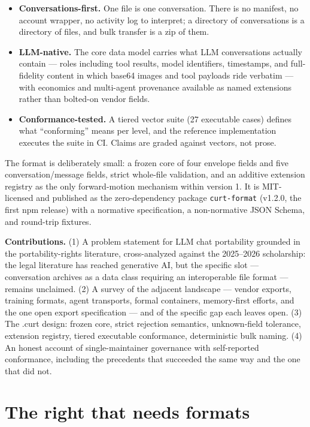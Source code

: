 \documentclass[11pt]{article}
\begin{document}
\begin{itemize}
\item \textbf{Conversations-first.} One file is one conversation. There is no manifest, no account wrapper, no activity log to interpret; a directory of conversations is a directory of files, and bulk transfer is a zip of them.
\item \textbf{LLM-native.} The core data model carries what LLM conversations actually contain --- roles including tool results, model identifiers, timestamps, and full-fidelity content in which base64 images and tool payloads ride verbatim --- with economics and multi-agent provenance available as named extensions rather than bolted-on vendor fields.
\item \textbf{Conformance-tested.} A tiered vector suite (27 executable cases) defines what ``conforming'' means per level, and the reference implementation executes the suite in CI. Claims are graded against vectors, not prose.
\end{itemize}

The format is deliberately small: a frozen core of four envelope fields and five conversation/message fields, strict whole-file validation, and an additive extension registry as the only forward-motion mechanism within version 1. It is MIT-licensed and published as the zero-dependency package \texttt{curt-format} (v1.2.0, the first npm release) with a normative specification, a non-normative JSON Schema, and round-trip fixtures.

\textbf{Contributions.} (1) A problem statement for LLM chat portability grounded in the portability-rights literature, cross-analyzed against the 2025--2026 scholarship: the legal literature has reached generative AI, but the specific slot --- conversation archives as a data class requiring an interoperable file format --- remains unclaimed. (2) A survey of the adjacent landscape --- vendor exports, training formats, agent transports, formal containers, memory-first efforts, and the one open export specification --- and of the specific gap each leaves open. (3) The .curt design: frozen core, strict rejection semantics, unknown-field tolerance, extension registry, tiered executable conformance, deterministic bulk naming. (4) An honest account of single-maintainer governance with self-reported conformance, including the precedents that succeeded the same way and the one that did not.

\section{The right that needs formats}
\end{document}
